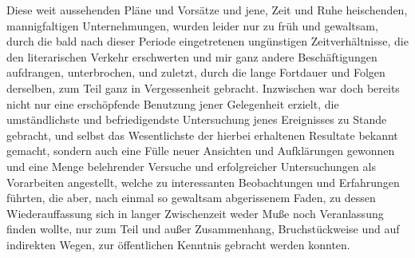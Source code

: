 \documentclass[a4paper, 11pt, oneside, german]{article}
\begin{document}
Diese weit aussehenden Pläne und Vorsätze und jene, Zeit und Ruhe heischenden, mannigfaltigen Unternehmungen, wurden leider nur zu früh und gewaltsam, durch die bald nach dieser Periode eingetretenen ungünstigen Zeitverhältnisse, die den literarischen Verkehr erschwerten und mir ganz andere Beschäftigungen aufdrangen, unterbrochen, und zuletzt, durch die lange Fortdauer und Folgen derselben, zum Teil ganz in Vergessenheit gebracht. Inzwischen war doch bereits nicht nur eine erschöpfende Benutzung jener Gelegenheit erzielt, die umständlichste und befriedigendste Untersuchung jenes Ereignisses zu Stande gebracht, und selbst das Wesentlichste der hierbei erhaltenen Resultate bekannt gemacht, sondern auch eine Fülle neuer Ansichten und Aufklärungen gewonnen und eine Menge belehrender Versuche und erfolgreicher Untersuchungen als Vorarbeiten angestellt, welche zu interessanten Beobachtungen und Erfahrungen führten, die aber, nach einmal so gewaltsam abgerissenem Faden, zu dessen Wiederauffassung sich in langer Zwischenzeit weder Muße noch Veranlassung finden wollte, nur zum Teil und außer Zusammenhang, Bruchstückweise und auf indirekten Wegen, zur öffentlichen Kenntnis gebracht werden konnten.
\end{document}
